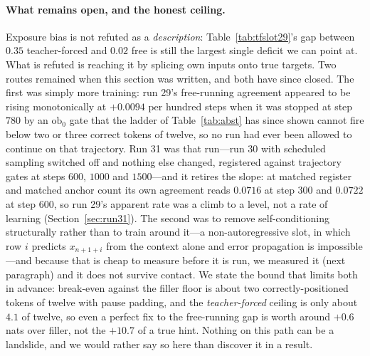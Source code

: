 \documentclass{article} %
\begin{document}
\paragraph{What remains open, and the honest ceiling.} Exposure bias is not refuted as a
\emph{description}: Table~\ref{tab:tfslot29}'s gap between $0.35$ teacher-forced and $0.02$ free is
still the largest single deficit we can point at. What is refuted is reaching it by splicing own
inputs onto true targets. Two routes remained when this section was written, and both have since
closed. The first was simply more training: run 29's free-running agreement appeared to be rising
monotonically at $+0.0094$ per hundred steps when it was stopped at step $780$ by
an $\mathrm{ob}_0$ gate that the ladder of Table~\ref{tab:abst} has since shown cannot fire below two
or three correct tokens of twelve, so no run had ever been allowed to continue on that trajectory.
Run 31 was that run---run 30 with scheduled sampling switched off and nothing else changed, registered
against trajectory gates at steps $600$, $1000$ and $1500$---and it retires the slope: at matched
register and matched anchor count its own agreement reads $0.0716$ at step $300$ and $0.0722$ at step
$600$, so run 29's apparent rate was a climb to a level, not a rate of learning
(Section~\ref{sec:run31}). The second was to remove
self-conditioning structurally rather than to train around it---a non-autoregressive slot, in which
row $i$ predicts $x_{n+1+i}$ from the context alone and error propagation is impossible---and because
that is cheap to measure before it is run, we measured it (next paragraph) and it does not survive
contact. We state the bound that limits both in advance: break-even against the
filler floor is about two correctly-positioned tokens of twelve with pause padding, and the
\emph{teacher-forced} ceiling is only about $4.1$ of twelve, so even a perfect fix to the
free-running gap is worth around $+0.6$ nats over filler, not the $+10.7$ of a true hint. Nothing on
this path can be a landslide, and we would rather say so here than discover it in a result.
\end{document}

